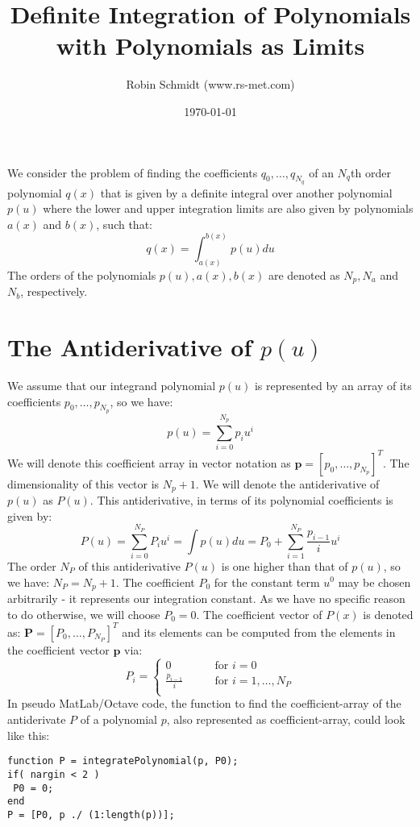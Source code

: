 \title{Definite Integration of Polynomials with Polynomials as Limits}
\author{Robin Schmidt (www.rs-met.com)}
\date{\today}
\maketitle

We consider the problem of finding the coefficients $q_0, \ldots, q_{N_q}$ of an $N_q$th order polynomial $q(x)$ that is given by a definite integral over another polynomial $p(u)$ where the lower and upper integration limits are also given by polynomials $a(x)$ and $b(x)$, such that:
\begin{equation}
\label{Eq:TheProblem}
 q(x) = \int_{a(x)}^{b(x)} p(u) du
\end{equation}
The orders of the polynomials $p(u), a(x), b(x)$ are denoted as $N_p, N_a$ and $N_b$, respectively.

\section{The Antiderivative of $p(u)$}
We assume that our integrand polynomial $p(u)$ is represented by an array of its coefficients $p_0, \ldots, p_{N_p}$, so we have:
\begin{equation}
 p(u) = \sum_{i=0}^{N_p} p_i u^i
\end{equation}
We will denote this coefficient array in vector notation as $\mathbf{p} = [p_0, \ldots, p_{N_p}]^T$. The dimensionality of this vector is $N_p+1$. We will denote the antiderivative of $p(u)$ as $P(u)$. This antiderivative, in terms of its polynomial coefficients is given by:
\begin{equation}
 P(u) = \sum_{i=0}^{N_P} P_i u^i = \int p(u) du = P_0 + \sum_{i=1}^{N_P} \frac{p_{i-1}}{i} u^i
\end{equation}
The order $N_P$ of this antiderivative $P(u)$ is one higher than that of $p(u)$, so we have: $N_P = N_p+1$. The coefficient $P_0$ for the constant term $u^0$ may be chosen arbitrarily - it represents our integration constant. As we have no specific reason to do otherwise, we will choose $P_0 = 0$. The coefficient vector of $P(x)$ is denoted as: $\mathbf{P} = [P_0, \ldots, P_{N_P}]^T$ and its elements can be computed from the elements in the coefficient vector $\mathbf{p}$ via:
\begin{equation}
 P_i =
  \begin{cases}
   0                   \qquad & \text{for } i = 0 \\
   \frac{p_{i-1}}{i}   \qquad & \text{for } i = 1, \ldots, N_P \\
  \end{cases}
\end{equation}
In pseudo MatLab/Octave code, the function to find the coefficient-array of the antiderivate $P$ of a polynomial $p$, also represented as coefficient-array, could look like this:
\begin{verbatim}
function P = integratePolynomial(p, P0);
if( nargin < 2 )
 P0 = 0;
end
P = [P0, p ./ (1:length(p))];
\end{verbatim}

